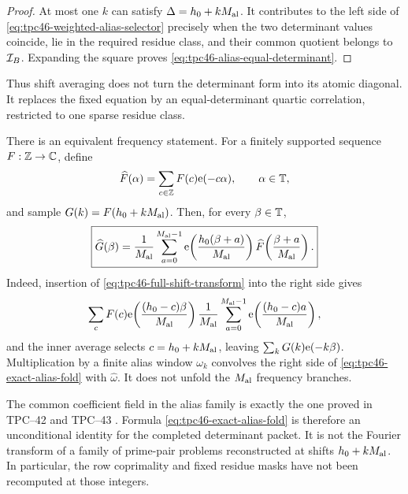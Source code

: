 \begin{proof}
At most one \(k\) can satisfy \(\Delta=h_0+kM_{\rm al}\).  It contributes to the
left side of \eqref{eq:tpc46-weighted-alias-selector} precisely when the
two determinant values coincide, lie in the required residue class, and
their common quotient belongs to \(\mathcal I_B\).  Expanding the square proves
\eqref{eq:tpc46-alias-equal-determinant}.
\end{proof}

Thus shift averaging does not turn the determinant form into its atomic
diagonal.  It replaces the fixed equation by an equal-determinant
quartic correlation, restricted to one sparse residue class.

There is an equivalent frequency statement.  For a finitely supported
sequence \(F:\mathbb Z\to\mathbb C\), define
\begin{equation}
 \widehat F(\alpha)=\sum_{c\in\mathbb Z}F(c)\mathrm e(-c\alpha),
 \qquad \alpha\in\mathbb T,
 \label{eq:tpc46-full-shift-transform}
\end{equation}
and sample \(G(k)=F(h_0+kM_{\rm al})\).  Then, for every
\(\beta\in\mathbb T\),
\begin{equation}
 \boxed{
 \widehat G(\beta)
 =\frac1{M_{\rm al}}\sum_{a=0}^{M_{\rm al}-1}
 \mathrm e\!\left(\frac{h_0(\beta+a)}{M_{\rm al}}\right)
 \widehat F\!\left(\frac{\beta+a}{M_{\rm al}}\right).}
 \label{eq:tpc46-exact-alias-fold}
\end{equation}
Indeed, insertion of \eqref{eq:tpc46-full-shift-transform} into the
right side gives
\[
 \sum_cF(c)\mathrm e\!\left(\frac{(h_0-c)\beta}{M_{\rm al}}\right)
 \frac1{M_{\rm al}}\sum_{a=0}^{M_{\rm al}-1}
 \mathrm e\!\left(\frac{(h_0-c)a}{M_{\rm al}}\right),
\]
and the inner average selects \(c=h_0+kM_{\rm al}\), leaving
\(\sum_kG(k)\mathrm e(-k\beta)\).  Multiplication by a finite alias window
\(\omega_k\) convolves the right side of
\eqref{eq:tpc46-exact-alias-fold} with \(\widehat\omega\).  It does not
unfold the \(M_{\rm al}\) frequency branches.

\begin{remark}
\label{rem:tpc46-alias-not-physical-shifts}
The common coefficient field in the alias family is exactly the one
proved in TPC--42 and TPC--43
\citep{WangTPC42,WangTPC43}.  Formula
\eqref{eq:tpc46-exact-alias-fold} is therefore an unconditional identity
for the completed determinant packet.  It is not the Fourier transform
of a family of prime-pair problems reconstructed at shifts
\(h_0+kM_{\rm al}\).  In particular, the row coprimality and fixed
residue masks
have not been recomputed at those integers.
\end{remark}


